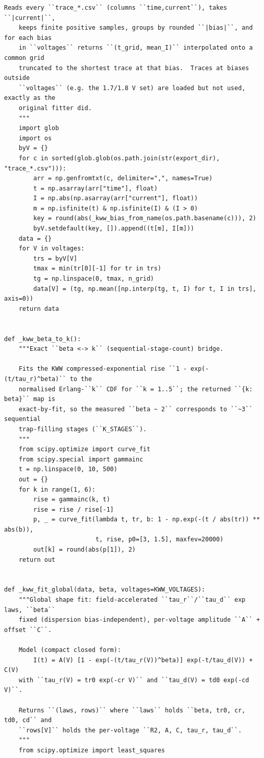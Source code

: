 \begin{lstlisting}[caption={mrl\_trace/device.py},label={lst:siox-src-device}]
    Reads every ``trace_*.csv`` (columns ``time,current``), takes ``|current|``,
    keeps finite positive samples, groups by rounded ``|bias|``, and for each bias
    in ``voltages`` returns ``(t_grid, mean_I)`` interpolated onto a common grid
    truncated to the shortest trace at that bias.  Traces at biases outside
    ``voltages`` (e.g. the 1.7/1.8 V set) are loaded but not used, exactly as the
    original fitter did.
    """
    import glob
    import os
    byV = {}
    for c in sorted(glob.glob(os.path.join(str(export_dir), "trace_*.csv"))):
        arr = np.genfromtxt(c, delimiter=",", names=True)
        t = np.asarray(arr["time"], float)
        I = np.abs(np.asarray(arr["current"], float))
        m = np.isfinite(t) & np.isfinite(I) & (I > 0)
        key = round(abs(_kww_bias_from_name(os.path.basename(c))), 2)
        byV.setdefault(key, []).append((t[m], I[m]))
    data = {}
    for V in voltages:
        trs = byV[V]
        tmax = min(tr[0][-1] for tr in trs)
        tg = np.linspace(0, tmax, n_grid)
        data[V] = (tg, np.mean([np.interp(tg, t, I) for t, I in trs], axis=0))
    return data


def _kww_beta_to_k():
    """Exact ``beta <-> k`` (sequential-stage-count) bridge.

    Fits the KWW compressed-exponential rise ``1 - exp(-(t/tau_r)^beta)`` to the
    normalised Erlang-``k`` CDF for ``k = 1..5``; the returned ``{k: beta}`` map is
    exact-by-fit, so the measured ``beta ~ 2`` corresponds to ``~3`` sequential
    trap-filling stages (``K_STAGES``).
    """
    from scipy.optimize import curve_fit
    from scipy.special import gammainc
    t = np.linspace(0, 10, 500)
    out = {}
    for k in range(1, 6):
        rise = gammainc(k, t)
        rise = rise / rise[-1]
        p, _ = curve_fit(lambda t, tr, b: 1 - np.exp(-(t / abs(tr)) ** abs(b)),
                         t, rise, p0=[3, 1.5], maxfev=20000)
        out[k] = round(abs(p[1]), 2)
    return out


def _kww_fit_global(data, beta, voltages=KWW_VOLTAGES):
    """Global shape fit: field-accelerated ``tau_r``/``tau_d`` exp laws, ``beta``
    fixed (dispersion bias-independent), per-voltage amplitude ``A`` + offset ``C``.

    Model (compact closed form):
        I(t) = A(V) [1 - exp(-(t/tau_r(V))^beta)] exp(-t/tau_d(V)) + C(V)
    with ``tau_r(V) = tr0 exp(-cr V)`` and ``tau_d(V) = td0 exp(-cd V)``.

    Returns ``(laws, rows)`` where ``laws`` holds ``beta, tr0, cr, td0, cd`` and
    ``rows[V]`` holds the per-voltage ``R2, A, C, tau_r, tau_d``.
    """
    from scipy.optimize import least_squares


\end{lstlisting}
